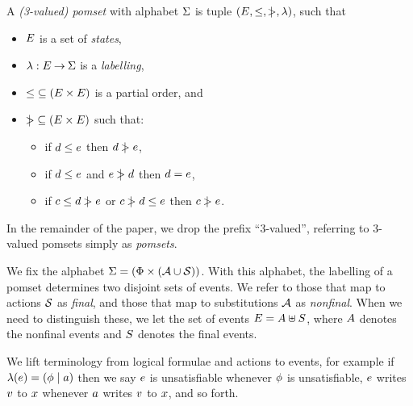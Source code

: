 \begin{definition}
  A \emph{(3-valued) pomset} with alphabet $\Sigma$ is tuple $(E,
  {\le}, {\mathrel{\,\mid\!\!\!>}}, \lambda)$, such that 
  \begin{itemize}
  \item $E$ is a set of \emph{states},
  \item $\lambda: E \mathbin\rightarrow \Sigma$ is a \emph{labelling},
  \item ${\le} \subseteq (E\times E)$ is a partial order, and
  \item ${\mathrel{\,\mid\!\!\!>}} \subseteq (E\times E)$ such that:
    \begin{itemize}
    \item\label{semi:5a} if $d \le e$ then $d \mathrel{\,\mid\!\!\!>} e$,
    \item\label{semi:5b} if $d \le e$ and $e \mathrel{\,\mid\!\!\!>} d$ then $d = e$,
    \item if $c \le d \mathrel{\,\mid\!\!\!>} e$ or $c \mathrel{\,\mid\!\!\!>} d \le e$ then $c \mathrel{\,\mid\!\!\!>} e$.
    \end{itemize}
\end{itemize}
\end{definition}
In the remainder of the paper, we drop the prefix ``3-valued'', referring to
3-valued pomsets simply as \emph{pomsets}.

We fix the alphabet $\Sigma=(\Phi\times(\mathcal{A}\cup\mathcal{S}))$.  With this
alphabet, the labelling of a pomset determines two disjoint sets of events.
We refer to those that map to actions $\mathcal{S}$ as \emph{final}, and those that
map to substitutions $\mathcal{A}$ as \emph{nonfinal}.
When we need to distinguish these, we let the set of events
$E=A\uplus S$, where $A$ denotes the nonfinal events 
and $S$ denotes the final events.

We lift terminology from logical formulae and actions to events, for example
if $\lambda(e)=(\phi\mid a)$ then we say $e$ is unsatisfiable
whenever $\phi$ is unsatisfiable, $e$ writes $v$ to $x$ whenever
$a$ writes $v$ to $x$, and so forth.


